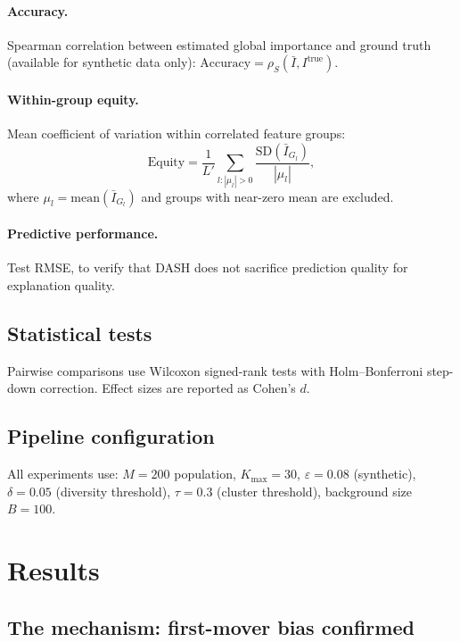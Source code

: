 \documentclass[11pt]{article}
\newcommand{\dash}{\textsc{DASH}}
\begin{document}
\paragraph{Accuracy.}
Spearman correlation between estimated global importance and ground truth
(available for synthetic data only):
$\text{Accuracy} = \rho_S(\bar{I}, I^{\text{true}})$.

\paragraph{Within-group equity.}
Mean coefficient of variation within correlated feature groups:
\begin{equation}
  \text{Equity} = \frac{1}{L'} \sum_{l : |\mu_l| > 0}
    \frac{\text{SD}(\bar{I}_{G_l})}{|\mu_l|},
\end{equation}
where $\mu_l = \text{mean}(\bar{I}_{G_l})$ and groups with near-zero
mean are excluded.

\paragraph{Predictive performance.}
Test RMSE, to verify that \dash{} does not sacrifice prediction quality
for explanation quality.

\subsection{Statistical tests}

Pairwise comparisons use Wilcoxon signed-rank tests with Holm--Bonferroni
step-down correction. Effect sizes are reported as Cohen's $d$.

\subsection{Pipeline configuration}

All experiments use: $M = 200$ population, $K_{\max} = 30$,
$\varepsilon = 0.08$ (synthetic), $\delta = 0.05$ (diversity threshold),
$\tau = 0.3$ (cluster threshold), background size $B = 100$.


\section{Results}
\label{sec:results}

\subsection{The mechanism: first-mover bias confirmed}
\label{sec:mechanism_result}
\end{document}
